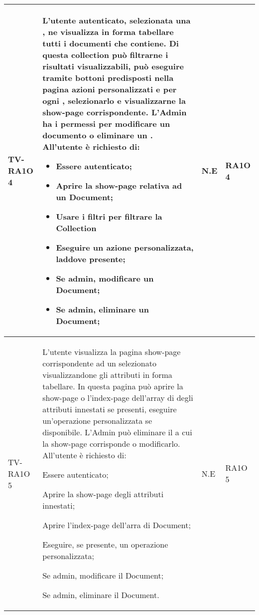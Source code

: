 \begin{center}
\begin{longtable}{| p{3cm} | p{6cm} | p{1.5cm} | p{2cm} | }
				TV-RA1O 4 & 
				L'utente autenticato, selezionata una \glossario{Collection}, ne visualizza in forma tabellare tutti i documenti che contiene. \newline Di questa collection può filtrarne i risultati visualizzabili, può eseguire tramite bottoni predisposti nella pagina azioni personalizzati e per ogni \glossario{Document}, selezionarlo e visualizzarne la show-page corrispondente. \newline L'Admin ha i permessi per modificare un documento o eliminare un \glossario{Document}. \newline
All'utente è richiesto di:
\begin{itemize}
\item Essere autenticato;
\item Aprire la show-page relativa ad un Document;
\item Usare i filtri per filtrare la Collection
\item Eseguire un azione personalizzata, laddove presente;
\item Se admin, modificare un Document;
\item Se admin, eliminare un Document;
\end{itemize} & N.E & RA1O 4\newline  \\ \hline 
				TV-RA1O 5 & 
				L'utente visualizza la pagina show-page corrispondente ad un \glossario{Document} selezionato visualizzandone gli attributi in forma tabellare. \newline In questa pagina può aprire la show-page o l'index-page dell'array di \glossario{Document} degli attributi innestati se presenti, eseguire un'operazione personalizzata se disponibile. \newline L'Admin può eliminare il \glossario{Document} a cui la show-page corrisponde o modificarlo. 
All'utente è richiesto di:
\begin{item}
\item Essere autenticato;
\item Aprire la show-page degli attributi innestati;
\item Aprire l'index-page dell'arra di Document;
\item Eseguire, se presente, un operazione personalizzata;
\item Se admin, modificare il Document;
\item Se admin, eliminare il Document.
\end{item} & N.E & RA1O 5\newline  \\ \hline 

\end{longtable}
\end{center}
